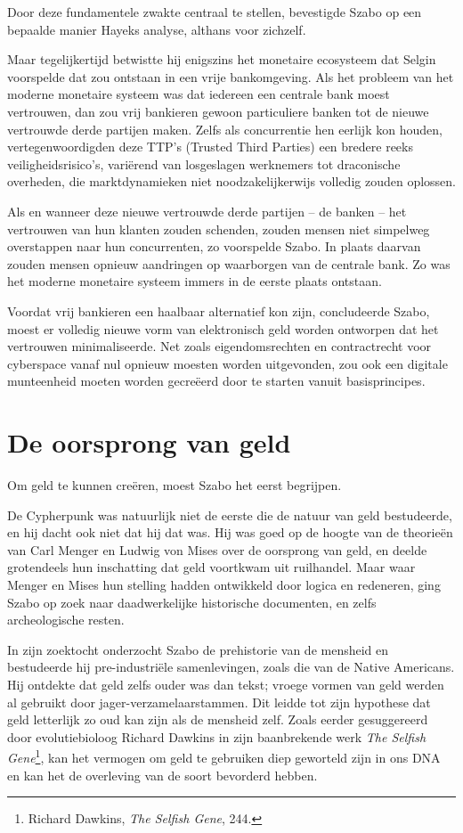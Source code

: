 \documentclass[
  a5paper,
  smalldemyvopaper,11pt,twoside,onecolumn,openright,extrafontsizes,
hidelinks]{memoir}
\begin{document}
Door deze fundamentele zwakte centraal te stellen, bevestigde Szabo op
een bepaalde manier Hayeks analyse, althans voor zichzelf.

Maar tegelijkertijd betwistte hij enigszins het monetaire ecosysteem dat
Selgin voorspelde dat zou ontstaan in een vrije bankomgeving. Als het
probleem van het moderne monetaire systeem was dat iedereen een centrale
bank moest vertrouwen, dan zou vrij bankieren gewoon particuliere banken
tot de nieuwe vertrouwde derde partijen maken. Zelfs als concurrentie
hen eerlijk kon houden, vertegenwoordigden deze TTP's (Trusted Third
Parties) een bredere reeks veiligheidsrisico's, variërend van
losgeslagen werknemers tot draconische overheden, die marktdynamieken
niet noodzakelijkerwijs volledig zouden oplossen.

Als en wanneer deze nieuwe vertrouwde derde partijen -- de banken -- het
vertrouwen van hun klanten zouden schenden, zouden mensen niet simpelweg
overstappen naar hun concurrenten, zo voorspelde Szabo. In plaats
daarvan zouden mensen opnieuw aandringen op waarborgen van de centrale
bank. Zo was het moderne monetaire systeem immers in de eerste plaats
ontstaan.

Voordat vrij bankieren een haalbaar alternatief kon zijn, concludeerde
Szabo, moest er volledig nieuwe vorm van elektronisch geld worden
ontworpen dat het vertrouwen minimaliseerde. Net zoals eigendomsrechten
en contractrecht voor cyberspace vanaf nul opnieuw moesten worden
uitgevonden, zou ook een digitale munteenheid moeten worden gecreëerd
door te starten vanuit basisprincipes.

\section{De oorsprong van geld}\label{de-oorsprong-van-geld}

Om geld te kunnen creëren, moest Szabo het eerst begrijpen.

De Cypherpunk was natuurlijk niet de eerste die de natuur van geld
bestudeerde, en hij dacht ook niet dat hij dat was. Hij was goed op de
hoogte van de theorieën van Carl Menger en Ludwig von Mises over de
oorsprong van geld, en deelde grotendeels hun inschatting dat geld
voortkwam uit ruilhandel. Maar waar Menger en Mises hun stelling hadden
ontwikkeld door logica en redeneren, ging Szabo op zoek naar
daadwerkelijke historische documenten, en zelfs archeologische resten.

In zijn zoektocht onderzocht Szabo de prehistorie van de mensheid en
bestudeerde hij pre-industriële samenlevingen, zoals die van de Native
Americans. Hij ontdekte dat geld zelfs ouder was dan tekst; vroege
vormen van geld werden al gebruikt door jager-verzamelaarstammen. Dit
leidde tot zijn hypothese dat geld letterlijk zo oud kan zijn als de
mensheid zelf. Zoals eerder gesuggereerd door evolutiebioloog Richard
Dawkins in zijn baanbrekende werk \emph{The Selfish Gene}\footnote{Richard
  Dawkins, \emph{The Selfish Gene}, 244.}, kan het vermogen om geld te
gebruiken diep geworteld zijn in ons DNA en kan het de overleving van de
soort bevorderd hebben.
\end{document}
